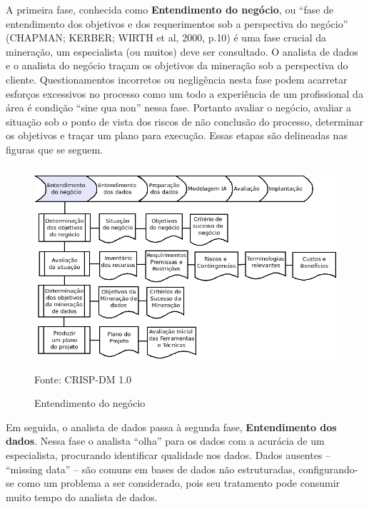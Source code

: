 A primeira fase, conhecida como \textbf{Entendimento do negócio}, ou ``fase de entendimento dos objetivos e dos requerimentos sob a 
perspectiva do negócio'' (CHAPMAN; KERBER; WIRTH et al, 2000, p.{10}) é uma fase crucial da mineração,  um especialista (ou muitos) deve ser consultado. 
O analista de dados e o analista do negócio traçam os objetivos da mineração sob a perspectiva do cliente. Questionamentos incorretos 
ou negligência nesta fase podem acarretar esforços excessivos no processo como um todo a experiência de um profissional da área 
é condição ``sine qua non'' nessa fase. Portanto avaliar o negócio, avaliar a situação sob o ponto de vista dos riscos de não conclusão 
do processo, determinar os objetivos e traçar um plano para execução. Essas etapas são delineadas nas figuras que se seguem.

\begin{figure}[!ht]
\centering
\caption{Entendimento do negócio}
\vspace{1mm}
\includegraphics[width=120mm, height=75mm]{Figuras/Cronograma/Entendimento.png}\\
\tiny Fonte: CRISP-DM 1.0
\end{figure}

\pagebreak

\vspace{0.5cm}

Em seguida, o analista de dados passa à segunda fase, \textbf{Entendimento dos dados}. Nessa fase o analista ``olha'' para os dados com a acurácia de um especialista, 
procurando identificar qualidade nos dados. Dados ausentes -- ``missing data'' -- são comuns em bases de dados não estruturadas, configurando-se como
um problema a ser considerado, pois seu tratamento pode consumir muito tempo do analista de dados. 

